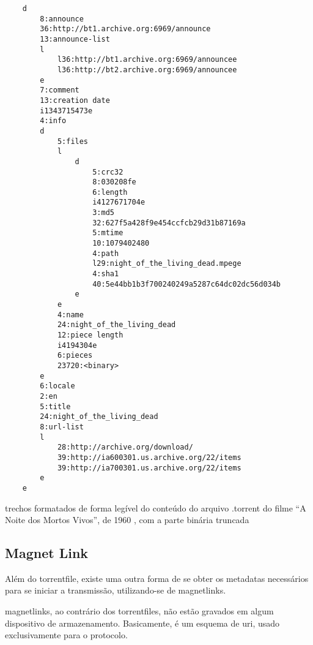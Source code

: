 \begin{listing}[H]
    \begin{verbatim}
    d
        8:announce
        36:http://bt1.archive.org:6969/announce
        13:announce-list
        l
            l36:http://bt1.archive.org:6969/announcee
            l36:http://bt2.archive.org:6969/announcee
        e
        7:comment
        13:creation date
        i1343715473e
        4:info
        d
            5:files
            l
                d
                    5:crc32
                    8:030208fe
                    6:length
                    i4127671704e
                    3:md5
                    32:627f5a428f9e454ccfcb29d31b87169a
                    5:mtime
                    10:1079402480
                    4:path
                    l29:night_of_the_living_dead.mpege
                    4:sha1
                    40:5e44bb1b3f700240249a5287c64dc02dc56d034b
                e
            e
            4:name
            24:night_of_the_living_dead
            12:piece length
            i4194304e
            6:pieces
            23720:<binary>
        e
        6:locale
        2:en
        5:title
        24:night_of_the_living_dead
        8:url-list
        l
            28:http://archive.org/download/
            39:http://ia600301.us.archive.org/22/items
            39:http://ia700301.us.archive.org/22/items
        e
    e
    \end{verbatim}
    \caption{trechos formatados de forma legível do conteúdo do arquivo .torrent do
    filme \enquote{A Noite dos Mortos Vivos}, de 1960 \cite{torrent-file}, com a parte
    binária truncada}
    \label{lst:torrent-file-code}
\end{listing}

\subsection*{Magnet Link}

Além do \gls*{torrentfile}, existe uma outra forma de se obter os \glspl*{metadata}
necessários para se iniciar a transmissão, utilizando-se de \glspl{magnetlink}.

\Glspl*{magnetlink}, ao contrário dos \glspl*{torrentfile}, não estão gravados em
algum dispositivo de armazenamento. Basicamente, é um esquema de \gls{uri}, usado
exclusivamente para o protocolo.

